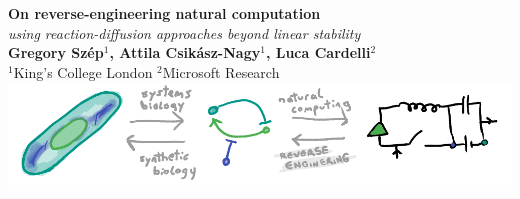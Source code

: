 \documentclass[a0,portrait]{a0poster}
\begin{document}


\begin{minipage}[b]{0.99\linewidth}
	\begin{center}
		\veryHuge \color{DarkRed} \textbf{On reverse-engineering natural computation} \color{Black}\\ %
		\Huge\textit{using reaction-diffusion approaches beyond linear stability}\\[2.4cm] %
		\huge \textbf{Gregory Sz\'ep$^1$, Attila Csik\'asz-Nagy$^1$, Luca Cardelli$^2$}\\[0.5cm] %
		\huge $^1$King's College London $^2$Microsoft Research\\[0.4cm] %
		\vspace{1cm}\includegraphics[width=70cm]{abstract}
	\end{center}
\end{minipage}
%
\begin{minipage}[b]{0.25\linewidth}

\end{minipage}

\vspace{1cm} %

\end{document}
